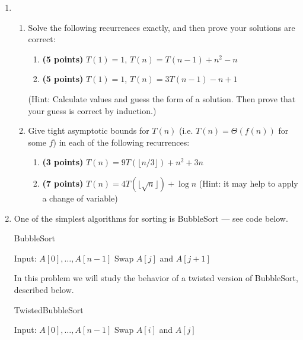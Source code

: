 \documentclass[11pt]{article}
\begin{document}
\begin{enumerate}[leftmargin=*]
\item \begin{enumerate}
    \item Solve the following recurrences exactly, and then prove your solutions are correct:
    \begin{enumerate}
        \item
        {\bf (5 points)} 
        $T(1) = 1$, $T(n) = T(n-1) + n^2 - n$
        \item
        {\bf (5 points)}
        $T(1) = 1$, $T(n) = 3T(n-1) - n + 1$
    \end{enumerate}
    (Hint: Calculate values and guess the form of a solution. Then prove that your guess is correct by induction.)
    \item Give tight asymptotic bounds for $T(n)$ (i.e. $T(n) = \Theta(f(n))$ for some $f$) in each of the following recurrences:
    \begin{enumerate}
        \item
        {\bf (3 points)}
        $T(n) = 9T(\lfloor n/3 \rfloor) + n^2 + 3n$
        \item 
        {\bf (7 points)}
        $T(n) = 4T(\lfloor \sqrt{n} \rfloor) + \log n$ (Hint: it may help to apply a change of variable)
    \end{enumerate}
\end{enumerate}

\item One of the simplest algorithms for sorting is BubbleSort --- see code below.

\begin{algorithm}
\caption{BubbleSort}
\begin{algorithmic}
\STATE Input: $A[0], \dots, A[n-1]$
            \STATE Swap $A[j]$ and $A[j+1]$
        \ENDIF
    \ENDFOR
\ENDFOR
\end{algorithmic}
\end{algorithm}

In this problem we will study the behavior of a twisted version of BubbleSort, described below.

\begin{algorithm}
\caption{TwistedBubbleSort}
\begin{algorithmic}
\STATE Input: $A[0], \dots, A[n-1]$
            \STATE Swap $A[i]$ and $A[j]$
        \ENDIF
    \ENDFOR
\ENDFOR
\end{algorithmic}
\end{algorithm}


\end{enumerate}
\end{document}
